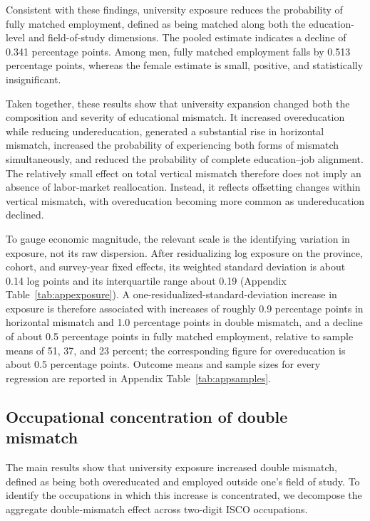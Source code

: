 Consistent with these findings, university exposure reduces the probability of fully matched employment, defined as being matched along both the education-level and field-of-study dimensions. The pooled estimate indicates a decline of 0.341 percentage points. Among men, fully matched employment falls by 0.513 percentage points, whereas the female estimate is small, positive, and statistically insignificant.

Taken together, these results show that university expansion changed both the composition and severity of educational mismatch. It increased overeducation while reducing undereducation, generated a substantial rise in horizontal mismatch, increased the probability of experiencing both forms of mismatch simultaneously, and reduced the probability of complete education--job alignment. The relatively small effect on total vertical mismatch therefore does not imply an absence of labor-market reallocation. Instead, it reflects offsetting changes within vertical mismatch, with overeducation becoming more common as undereducation declined.

To gauge economic magnitude, the relevant scale is the identifying variation in exposure, not its raw dispersion. After residualizing log exposure on the province, cohort, and survey-year fixed effects, its weighted standard deviation is about 0.14 log points and its interquartile range about 0.19 (Appendix Table~\ref{tab:appexposure}). A one-residualized-standard-deviation increase in exposure is therefore associated with increases of roughly 0.9 percentage points in horizontal mismatch and 1.0 percentage points in double mismatch, and a decline of about 0.5 percentage points in fully matched employment, relative to sample means of 51, 37, and 23 percent; the corresponding figure for overeducation is about 0.5 percentage points. Outcome means and sample sizes for every regression are reported in Appendix Table~\ref{tab:appsamples}.

\subsection{Occupational concentration of double mismatch}

The main results show that university exposure increased double mismatch, defined as being both overeducated and employed outside one's field of study. To identify the occupations in which this increase is concentrated, we decompose the aggregate double-mismatch effect across two-digit ISCO occupations.

